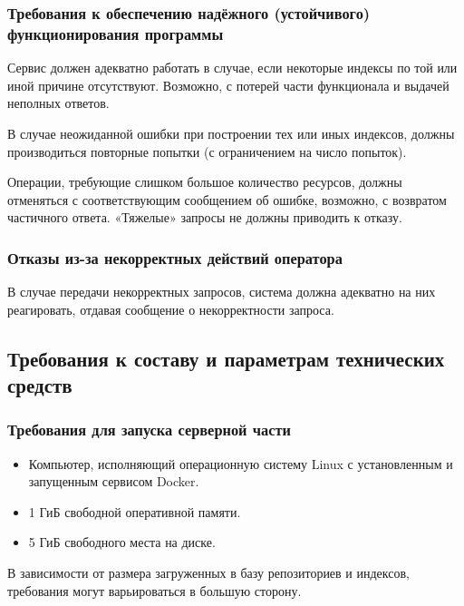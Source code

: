     \subsubsection{Требования к обеспечению надёжного (устойчивого) функционирования программы}
    	Сервис должен адекватно работать в случае, если некоторые индексы по той или иной причине отсутствуют. Возможно, с потерей части функционала и выдачей неполных ответов.
    	
    	В случае неожиданной ошибки при построении тех или иных индексов, должны производиться повторные попытки (с ограничением на число попыток).
    	
    	Операции, требующие слишком большое количество ресурсов, должны отменяться с соответствующим сообщением об ошибке, возможно, с возвратом частичного ответа. «Тяжелые» запросы не должны приводить к отказу.

    \subsubsection{Отказы из-за некорректных действий оператора}
    	В случае передачи некорректных запросов, система должна адекватно на них реагировать, отдавая сообщение о некорректности запроса.

% 	

\subsection{Требования к составу и параметрам технических средств}
    \subsubsection{Требования для запуска серверной части}
        \begin{itemize}
            \item Компьютер, исполняющий операционную систему Linux с установленным и запущенным сервисом Docker.
            \item 1 ГиБ свободной оперативной памяти.
            \item 5 ГиБ свободного места на диске.
        \end{itemize}
        
        В зависимости от размера загруженных в базу репозиториев и индексов, требования могут варьироваться в большую сторону.
    
